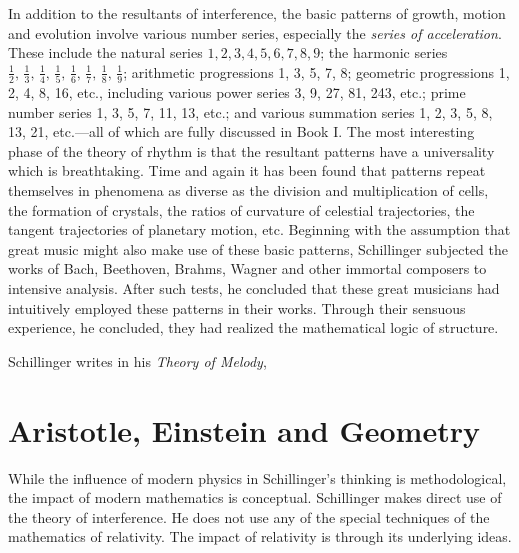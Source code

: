 In addition to the resultants of interference, the basic patterns of growth,
motion and evolution involve various number series, especially the
\textit{series of acceleration}. These include the natural series $1, 2, 3, 4,
5, 6, 7, 8, 9$; the harmonic series
$\frac{1}{2},\,\frac{1}{3},\,\frac{1}{4},\,\frac{1}{5},\,\frac{1}{6},\,\frac{1}{7},\,\frac{1}{8},\,\frac{1}{9}$;
arithmetic progressions 1, 3, 5, 7, 8; geometric progressions 1, 2, 4, 8, 16,
etc., including various power series 3, 9, 27, 81, 243, etc.; prime number
series 1, 3, 5, 7, 11, 13, etc.; and various summation series 1, 2, 3, 5, 8,
13, 21, etc.---all of which are fully discussed in Book I. The most interesting
phase of the theory of rhythm is that the resultant patterns have a
universality which is breathtaking. Time and again it has been found that
patterns repeat themselves in phenomena as diverse as the division and
multiplication of cells, the formation of crystals, the ratios of curvature of
celestial trajectories, the tangent trajectories of planetary motion, etc.
Beginning with the assumption that great music might also make use of these
basic patterns, Schillinger subjected the works of Bach, Beethoven, Brahms,
Wagner and other immortal composers to intensive analysis. After such tests, he
concluded that these great musicians had intuitively employed these patterns in
their works. Through their sensuous experience, he concluded, they had realized
the mathematical logic of structure.

 Schillinger writes in his \textit{Theory of
Melody}, 

\section{Aristotle, Einstein and Geometry}


While the influence of modern physics in Schillinger's thinking is
methodological, the impact of modern mathematics is conceptual. Schillinger
makes direct use of the theory of interference. He does not use any of the
special techniques of the mathematics of relativity. The impact of relativity
is through its underlying ideas.

